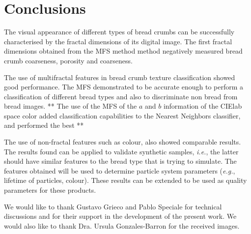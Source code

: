 


\section{Conclusions}
\label{sec:11}
The visual appearance of different types of bread crumbs can be successfully characterised by the fractal dimensions of its digital image. The first fractal dimensions obtained from the MFS method method negatively measured bread crumb coarseness, porosity and coarseness. 


The use of multifractal features in bread crumb texture classification showed good performance. The MFS demonstrated to be accurate enough to perform a classification of different bread types and also to discriminate non bread from bread images. ** The use of the MFS of the $a$ and $b$ information of the CIElab space color added classification capabilities to the Nearest Neighbors classifier, and performed the best **

The use of non-fractal features such as colour, also showed comparable results. The results found can be applied to validate synthetic samples, {\em i.e.}, the latter should have similar features to the bread type that is trying to simulate. The features obtained will be used to determine particle system parameters ({\em e.g.}, lifetime of particles, colour). These results can be extended to be used as quality parameters for these products.

\begin{acknowledgements}
We would like to thank Gustavo Grieco and Pablo Speciale for technical discussions and for their support in the development of the present work. We would also like to thank Dra. Ursula Gonzales-Barron for the received images.
\end{acknowledgements}

